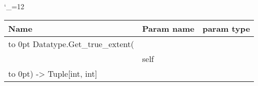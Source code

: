 \begingroup \catcode`\_=12 \tt
\begin{tabular}{lll}
\toprule
\textrm{Name}&\textrm{Param name}&\textrm{param type}\\
\midrule
\hbox to 0pt {Datatype.Get_true_extent(\hss}\\
& self\\
\hbox to 0pt{) -> Tuple[int, int]\hss}\\
\bottomrule
\end{tabular}
\endgroup
